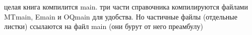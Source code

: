 целая книга компилится main. три части справочника компилируются файлами MTmain, Emain и OQmain для удобства. Но частичные файлы (отдельные листки) ссылаются на файл main (они бурут от него преамбулу)

